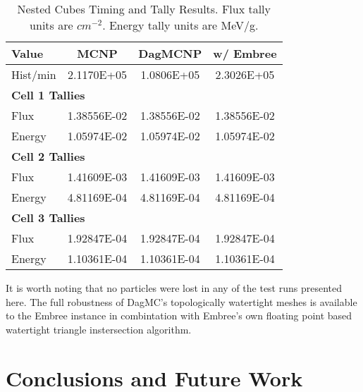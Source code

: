 \documentclass{anstrans}
\begin{document}
\begin{table}[h]

  \begin{center}
    \caption{Nested Cubes Timing and Tally Results. Flux tally units are $cm^{-2}$. Energy tally units are MeV/g.  }
    
    \begin{tabular}{lccc}
      \toprule
      Value & MCNP & DagMCNP & w/ Embree \\
      \toprule
      Hist/min & 2.1170E+05 & 1.0806E+05 & 2.3026E+05 \\
      \hline
      \multicolumn{4}{l}{\textbf{Cell 1 Tallies}} \\
      \hline
      Flux  & 1.38556E-02 & 1.38556E-02 & 1.38556E-02 \\
      Energy  & 1.05974E-02 & 1.05974E-02 & 1.05974E-02 \\
      \hline
      \multicolumn{4}{l}{\textbf{Cell 2 Tallies}} \\
      \hline
      Flux  & 1.41609E-03 & 1.41609E-03 & 1.41609E-03 \\
      Energy  & 4.81169E-04 & 4.81169E-04 & 4.81169E-04 \\
      \hline
      \multicolumn{4}{l}{\textbf{Cell 3 Tallies}} \\
      \hline
      Flux  & 1.92847E-04 & 1.92847E-04 & 1.92847E-04 \\
      Energy  & 1.10361E-04 & 1.10361E-04 & 1.10361E-04 \\
      \bottomrule
      
                        
    \end{tabular}


  \end{center}
\vspace{-0.2 cm}
\end{table}
It is worth noting that no particles were lost in any of the test runs presented here. The full robustness of DagMC's topologically watertight meshes \cite{make_watertight_smith_2010} is available to the Embree instance in combintation with Embree's own floating point based watertight triangle instersection algorithm. \cite{watertight_tri_intersection_woop_2013}

\section{Conclusions and Future Work}
\end{document}
